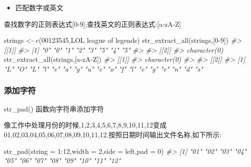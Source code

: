 \documentclass[
]{book}
\newenvironment{Shaded}{\begin{snugshade}}{\end{snugshade}}
\newcommand{\AttributeTok}[1]{\textcolor[rgb]{0.77,0.63,0.00}{#1}}
\newcommand{\CommentTok}[1]{\textcolor[rgb]{0.56,0.35,0.01}{\textit{#1}}}
\newcommand{\DecValTok}[1]{\textcolor[rgb]{0.00,0.00,0.81}{#1}}
\newcommand{\FunctionTok}[1]{\textcolor[rgb]{0.00,0.00,0.00}{#1}}
\newcommand{\NormalTok}[1]{#1}
\newcommand{\OtherTok}[1]{\textcolor[rgb]{0.56,0.35,0.01}{#1}}
\newcommand{\SpecialCharTok}[1]{\textcolor[rgb]{0.00,0.00,0.00}{#1}}
\newcommand{\StringTok}[1]{\textcolor[rgb]{0.31,0.60,0.02}{#1}}
\providecommand{\tightlist}{%
  \setlength{\itemsep}{0pt}\setlength{\parskip}{0pt}}
\begin{document}
\begin{itemize}
\tightlist
\item
  匹配数字或英文
\end{itemize}

查找数字的正则表达式{[}0-9{]};查找英文的正则表达式:{[}a-zA-Z{]}

\begin{Shaded}
\begin{Highlighting}[]
\NormalTok{strings }\OtherTok{\textless{}{-}} \FunctionTok{c}\NormalTok{(}\StringTok{\textquotesingle{}00123545\textquotesingle{}}\NormalTok{,}\StringTok{\textquotesingle{}LOL league of legends\textquotesingle{}}\NormalTok{)}
\FunctionTok{str\_extract\_all}\NormalTok{(strings,}\StringTok{\textquotesingle{}[0{-}9]\textquotesingle{}}\NormalTok{)}
\CommentTok{\#\textgreater{} [[1]]}
\CommentTok{\#\textgreater{} [1] "0" "0" "1" "2" "3" "5" "4" "5"}
\CommentTok{\#\textgreater{} }
\CommentTok{\#\textgreater{} [[2]]}
\CommentTok{\#\textgreater{} character(0)}
\FunctionTok{str\_extract\_all}\NormalTok{(strings,}\StringTok{\textquotesingle{}[a{-}zA{-}Z]\textquotesingle{}}\NormalTok{) }
\CommentTok{\#\textgreater{} [[1]]}
\CommentTok{\#\textgreater{} character(0)}
\CommentTok{\#\textgreater{} }
\CommentTok{\#\textgreater{} [[2]]}
\CommentTok{\#\textgreater{}  [1] "L" "O" "L" "l" "e" "a" "g" "u" "e" "o" "f" "l" "e" "g" "e" "n" "d" "s"}
\end{Highlighting}
\end{Shaded}

\hypertarget{ux6dfbux52a0ux5b57ux7b26}{%
\subsubsection{添加字符}\label{ux6dfbux52a0ux5b57ux7b26}}

str\_pad() 函数向字符串添加字符

像工作中处理月份的时候,1,2,3,4,5,6,7,8,9,10,11,12变成01,02,03,04,05,06,07,08,09,10,11,12.按照日期时间输出文件名称,如下所示:

\begin{Shaded}
\begin{Highlighting}[]
\FunctionTok{str\_pad}\NormalTok{(}\AttributeTok{string =} \DecValTok{1}\SpecialCharTok{:}\DecValTok{12}\NormalTok{,}\AttributeTok{width =} \DecValTok{2}\NormalTok{,}\AttributeTok{side =} \StringTok{\textquotesingle{}left\textquotesingle{}}\NormalTok{,}\AttributeTok{pad =} \StringTok{\textquotesingle{}0\textquotesingle{}}\NormalTok{)}
\CommentTok{\#\textgreater{}  [1] "01" "02" "03" "04" "05" "06" "07" "08" "09" "10" "11" "12"}
\end{Highlighting}
\end{Shaded}
\end{document}
